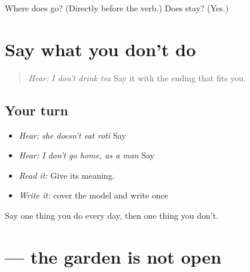 \begin{tcolorbox}[breakable,colback=teal!4,colframe=teal!35!black,title={Before you move on}]
Where does \textbf{} go? (Directly before the verb.) Does \textbf{} stay? (Yes.)
\end{tcolorbox}
\section[\texorpdfstring{\pa{ਨਹੀਂ} \pa{ਪੀਂਦਾ} \pa{ਹਾਂ} (nahīṁ pīndā hāṁ)}{ਨਹੀਂ ਪੀਂਦਾ ਹਾਂ (nahīṁ pīndā hāṁ)}]{Say what you don't do}

\label{lesson:PA-C212-nahin-review}



\begin{quote}
\emph{Hear:} \emph{I don't drink tea} Say it with the ending that fits you.
\end{quote}

\subsection*{Your turn}
\begin{itemize}
\raggedright
  \item \emph{Hear:} \emph{she doesn't eat roti} Say \textbf{    }
  \item \emph{Hear:} \emph{I don't go home, as a man} Say \textbf{    }
  \item \emph{Read it:} \textbf{    } Give its meaning.
  \item \emph{Write it:} cover the model and write \textbf{    } once
\end{itemize}

\begin{tcolorbox}[breakable,colback=teal!4,colframe=teal!35!black,title={Before you move on}]
Say one thing you do every day, then one thing you don't.
\end{tcolorbox}
\section[\texorpdfstring{\pa{ਬਾਗ਼} \pa{ਖੁੱਲ੍ਹਾ} \pa{ਨਹੀਂ} \pa{ਹੈ।} (bāgh khullhā …)}{ਬਾਗ਼ ਖੁੱਲ੍ਹਾ ਨਹੀਂ ਹੈ। (bāgh khullhā …)}]{    — the garden is not open}

\label{lesson:PA-C212-not-open}



